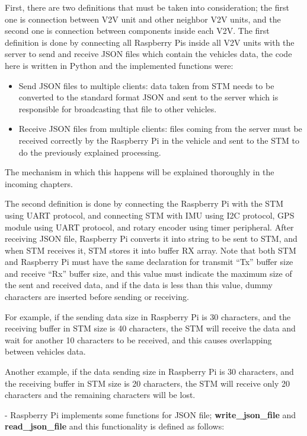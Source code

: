 First, there are two definitions that must be taken into consideration; the first one is connection between V2V unit and other neighbor V2V units, and the second one is connection between components inside each V2V.
The first definition is done by connecting all Raspberry Pis inside all V2V units with the server to send and receive JSON files which contain the vehicles data, the code here is written in Python and the implemented functions were:
\begin{itemize}
    \item Send JSON files to multiple clients: data taken from STM needs to be converted to the standard format JSON and sent to the server which is responsible for broadcasting that file to other vehicles.
    \item Receive JSON files from multiple clients: files coming from the server must be received correctly by the Raspberry Pi in the vehicle and sent to the STM to do the previously explained processing.
\end{itemize}
The mechanism in which this happens will be explained thoroughly in the incoming chapters.

The second definition is done by connecting the Raspberry Pi with the STM using UART protocol, and connecting STM with IMU using I2C protocol, GPS module using UART protocol, and rotary encoder using timer peripheral.
After receiving JSON file, Raspberry Pi converts it into string to be sent to STM, and when STM receives it, STM stores it into buffer RX array. Note that both STM and Raspberry Pi  must have the same declaration for transmit “Tx” buffer size and receive “Rx” buffer size, and this value must indicate the maximum size of the sent and received data, and if the data is less than this value, dummy characters are inserted before sending or receiving.

For example, if the sending data size in Raspberry Pi is 30 characters, and the receiving buffer in STM size is 40 characters, the STM will receive the data and wait for another 10 characters to be received, and this causes overlapping between vehicles data.

Another example, if the data sending size in Raspberry Pi  is 30 characters, and the receiving buffer in STM size is 20 characters, the STM will receive only 20 characters and the remaining characters will be lost.
 
- Raspberry Pi implements some functions for JSON file; \textbf{write\_json\_file} and \textbf{read\_json\_file} and this functionality is defined as follows:

